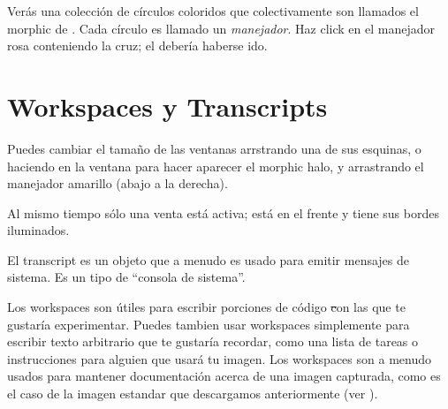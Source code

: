 \documentclass[a4paper,10pt,twoside]{book}
\begin{document}
Ver\'as una colecci\'on de c\'irculos coloridos que colectivamente son llamados el morphic  de \bam.
Cada c\'irculo es llamado un \emph{manejador}.
Haz click en el manejador rosa conteniendo la cruz; el \bam deber\'ia haberse ido. 

\section{Workspaces y Transcripts}


Puedes cambiar el tama\~no de las ventanas arrstrando una de sus esquinas, o haciendo \metaclick en la ventana para hacer aparecer el morphic halo, y arrastrando el manejador amarillo (abajo a la derecha).

Al mismo tiempo s\'olo una venta est\'a activa; est\'a en el frente y tiene sus bordes iluminados.

El transcript es un objeto que a menudo es usado para emitir mensajes de sistema.
Es un tipo de ``consola de sistema''.

Los workspaces son \'utiles para escribir porciones de c\'odigo \st con las que te gustar\'ia experimentar.
Puedes tambien usar workspaces simplemente para escribir texto arbitrario que te gustar\'ia recordar, como una lista de tareas o instrucciones para alguien que usar\'a tu imagen.
Los workspaces son a menudo usados para mantener documentaci\'on acerca de una imagen capturada, como es el caso de la imagen estandar que descargamos anteriormente (ver ).
\end{document}
